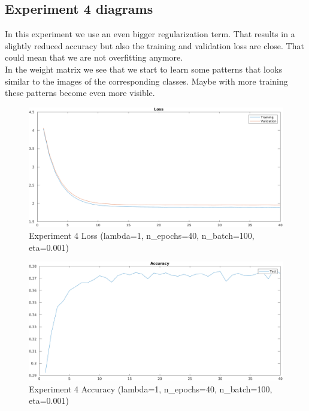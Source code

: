 \clearpage
\subsection{Experiment 4 diagrams}
In this experiment we use an even bigger regularization term. That results in a slightly reduced accuracy but also the training 
and validation loss are close. That could mean that we are not overfitting anymore.\\
In the weight matrix we see that we start to learn some patterns that looks similar to the images of the corresponding classes. 
Maybe with more training these patterns become even more visible.

    \begin{figure}[ht]
        \includegraphics[width=\textwidth]{../code/result_pics/lambda=1, n_epochs=40, n_batch=100, eta=.001/loss.png}
        \caption{Experiment 4 Loss (lambda=1, n\_epochs=40, n\_batch=100, eta=0.001)}
        \label{fig:loss4}
    \end{figure}

    \begin{figure}[ht]
        \includegraphics[width=\textwidth]{../code/result_pics/lambda=1, n_epochs=40, n_batch=100, eta=.001/accuracy.png}
        \caption{Experiment 4 Accuracy (lambda=1, n\_epochs=40, n\_batch=100, eta=0.001)}
        \label{fig:accuracy4}
    \end{figure}

